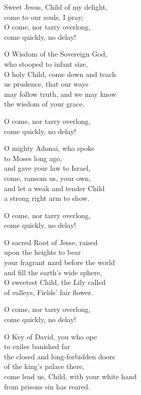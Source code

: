 \begin{lyrics}
Sweet Jesus, Child of my delight,\\
come to our souls, I pray;\\
O come, nor tarry overlong,\\
come quickly, no delay!

O Wisdom of the Sovereign God,\\
who stooped to infant size,\\
O holy Child, come down and teach\\
us prudence, that our ways\\
may follow truth, and we may know\\
the wisdom of your grace.

O come, nor tarry overlong,\\
come quickly, no delay!

O mighty Adonai, who spoke\\
to Moses long ago,\\
and gave your law to Israel,\\
come, ransom us, your own,\\
and let a weak and tender Child\\
a strong right arm to show.

O come, nor tarry overlong,\\
come quickly, no delay!

O sacred Root of Jesse, raised\\
upon the heights to bear\\
your fragrant nard before the world\\
and fill the earth’s wide sphere,\\
O sweetest Child, the Lily called\\
of valleys, Fields’ fair flower.

O come, nor tarry overlong,\\
come quickly, no delay!

O Key of David, you who ope\\
to exiles banished far\\
the closed and long-forbidden doors\\
of the king’s palace there,\\
come lead us, Child, with your white hand\\
from prisons sin has reared.


\end{lyrics}
